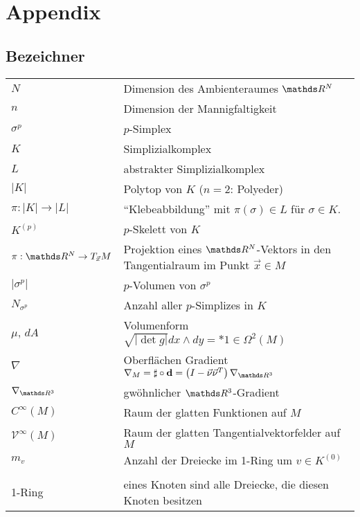 \newcommand{\trace}{\text{Trace}}


\chapter{Appendix}

\section{Bezeichner}

\begin{tabular}{p{}p{}}
  \( N \) & Dimension des Ambienteraumes \( \R^{N} \) \\
  \( n \) & Dimension der Mannigfaltigkeit \\
  \( \sigma^{p} \) & \( p \)-Simplex \\
  \( K \) & Simplizialkomplex \\
  \( L \) & abstrakter Simplizialkomplex\\
  \( |K| \) & Polytop von \( K \) (\( n=2 \): Polyeder)\\
  \( \pi: |K| \rightarrow |L| \) & "`Klebeabbildung"'  mit \( \pi(\sigma)\in L \) für \( \sigma\in K \). \\
  \( K^{(p)} \) & \( p \)-Skelett von \( K \)\\
  \( \pi: \R^{N}\rightarrow T_{\vec{x}}M \) & Projektion eines \( \R^{N} \)-Vektors in den Tangentialraum im Punkt \( \vec{x}\in M \) \\
  \( \left| \sigma^{p} \right| \) & \( p \)-Volumen von \( \sigma^{p} \)\\
  \( N_{\sigma^{p}} \) & Anzahl aller \( p \)-Simplizes in \( K \)\\
  \( \mu \), \( dA \) & Volumenform \( \sqrt{|\det g|} dx\wedge dy = *1 \in \Omega^{2}(M) \) \\
  \( \nabla \) & Oberflächen Gradient \( \nabla_{M} = \sharp\circ\exd 
                                                    = \left( I - \vec{\nu}\vec{\nu}^{T}
                                                    \right)\nabla_{\R^{3}} \) \\
  \( \nabla_{\R^{3}} \) & gwöhnlicher \( \R^{3} \)-Gradient \\
  \( C^{\infty}(M) \) & Raum der glatten Funktionen auf \( M \) \\
  \( \mathcal{V}^{\infty}(M) \) & Raum der glatten Tangentialvektorfelder auf \( M \) \\
  \( m_{v} \) & Anzahl der Dreiecke im 1-Ring um \( v\in K^{(0)}\)\\
  &\\
  1-Ring & eines Knoten sind alle Dreiecke, die diesen Knoten besitzen \\
\end{tabular}


